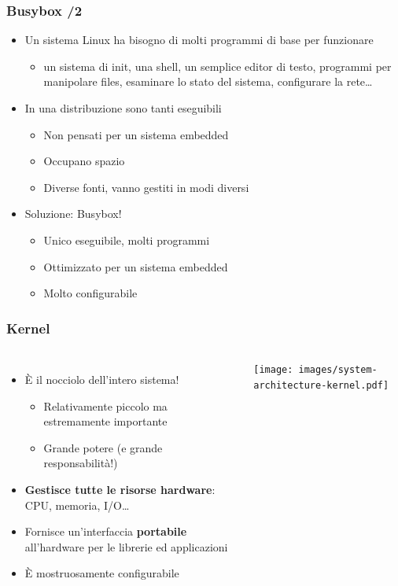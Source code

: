 \documentclass[xetex,table]{beamer}
\begin{document}
\begin{frame}
\frametitle{Busybox /2}
  \begin{itemize}
    \item Un sistema Linux ha bisogno di molti programmi di base per
      funzionare
      \begin{itemize}
        \item un sistema di init, una shell, un semplice editor di
          testo, programmi per manipolare files, esaminare lo stato
          del sistema, configurare la rete\ldots
      \end{itemize}
    \item In una distribuzione sono tanti eseguibili
      \begin{itemize}
        \item Non pensati per un sistema embedded
        \item Occupano spazio
        \item Diverse fonti, vanno gestiti in modi diversi
      \end{itemize}
    \item Soluzione: Busybox!
      \begin{itemize}
        \item Unico eseguibile, molti programmi
        \item Ottimizzato per un sistema embedded
        \item Molto configurabile
      \end{itemize}
  \end{itemize}
\end{frame}

\begin{frame}
\frametitle{Kernel}
  \begin{columns}
    \begin{itemize}
      \item È il nocciolo dell'intero sistema!
      \begin{itemize}
        \item Relativamente piccolo ma estremamente importante
        \item Grande potere (e grande responsabilità!)
      \end{itemize}
      \item {\bf Gestisce tutte le risorse hardware}: CPU, memoria, I/O\ldots
      \item Fornisce un'interfaccia {\bf portabile} all'hardware per le
        librerie ed applicazioni
      \item È mostruosamente configurabile
    \end{itemize}
    \texttt{[image: images/system-architecture-kernel.pdf]}
  \end{columns}
\end{frame}
\end{document}
